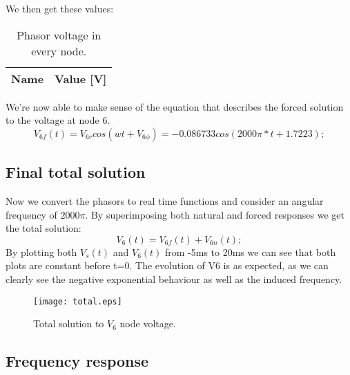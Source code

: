 We then get these values:
\begin{table}[h]
  \centering
  \begin{tabular}{|l|r|}
    \hline    
    {\bf Name} & {\bf Value [V]} \\ \hline
     
  \end{tabular}
  \caption{Phasor voltage in every node.}
  \label{tab:phasor}
\end{table} \par
We're now able to make sense of the equation that describes the forced solution to the voltage at node 6.
\begin{equation}
V_{6f}(t)=V_{6r}cos(wt+V_{6\phi})=-0.086733cos(2000\pi*t+1.7223);
\end{equation}
\subsection{Final total solution}
Now we convert the phasors to real time functions and consider an angular frequency of $2000\pi$. By superimposing both natural and forced responses we get the total solution:
\begin{equation}
V_{6}(t)=V_{6f}(t)+V_{6n}(t);
\end{equation}
By plotting both $V_s(t)$ and $V_6(t)$ from -5ms to 20ms we can see that both plots are constant before t=0. The evolution of V6 is as expected, as we can clearly see the negative exponential behaviour as well as the induced frequency.
\begin{figure}[h] \centering
\texttt{[image: total.eps]}
\caption{Total solution to $V_{6}$ node voltage.}
\label{fig:current}
\end{figure}\pagebreak
\subsection{Frequency response}
